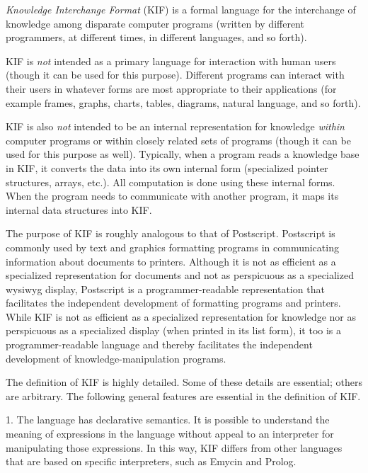 {\it Knowledge Interchange Format} (KIF) is a formal language for the interchange
of knowledge among disparate computer programs (written by different programmers,
at different times, in different languages, and so forth). 

KIF is {\it not} intended as a primary language for interaction with human users
(though it can be used for this purpose).  Different programs can interact with
their users in whatever forms are most appropriate to their applications (for
example frames, graphs, charts, tables, diagrams, natural language, and so forth).

KIF is also {\it not} intended to be an internal representation for knowledge
{\it within} computer programs or within closely related sets of programs
(though it can be used for this purpose as well).  Typically, when a program
reads a  knowledge base in KIF, it converts the data into its own internal form
(specialized pointer structures, arrays, etc.).  All computation is done
using these internal forms.  When the program needs to communicate with
another program, it maps its internal data structures into KIF.

The purpose of KIF is roughly analogous to that of Postscript.  Postscript
is commonly used by text and graphics formatting programs in communicating
information about documents to printers.  Although it is not as efficient as a
specialized representation for documents and not as perspicuous as a specialized
wysiwyg display, Postscript is a programmer-readable representation that
facilitates the independent development of formatting programs and printers. 
While KIF is not as efficient as a specialized representation for knowledge nor
as perspicuous as a specialized display (when printed in its list form), it too
is a programmer-readable language and thereby facilitates the independent
development of knowledge-manipulation programs.

The definition of KIF is highly detailed.  Some of these details are essential;
others are arbitrary.   The following general features are essential in the
definition of KIF.

\medskip

\item{1.} The language has declarative semantics.  It is possible to
understand the meaning of expressions in the language without appeal to an
interpreter for manipulating those expressions.  In this way, KIF differs from
other languages that are based on specific interpreters, such as Emycin
and Prolog.

